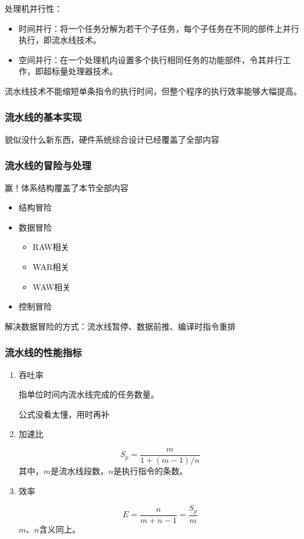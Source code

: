 \documentclass[12pt, a4paper, oneside]{ctexart}
\begin{document}
处理机并行性：
\begin{itemize}
  \item 时间并行：将一个任务分解为若干个子任务，每个子任务在不同的部件上并行执行，即流水线技术。
  \item 空间并行：在一个处理机内设置多个执行相同任务的功能部件，令其并行工作，即超标量处理器技术。
\end{itemize}

流水线技术不能缩短单条指令的执行时间，但整个程序的执行效率能够大幅提高。

\subsubsection{流水线的基本实现}

貌似没什么新东西，硬件系统综合设计已经覆盖了全部内容

\subsubsection{流水线的冒险与处理}

赢！体系结构覆盖了本节全部内容

\begin{itemize}
  \item 结构冒险
  \item 数据冒险
  \begin{itemize}
    \item RAW相关
    \item WAR相关
    \item WAW相关
  \end{itemize}
  \item 控制冒险
\end{itemize}

解决数据冒险的方式：流水线暂停、数据前推、编译时指令重排

\subsubsection{流水线的性能指标}

\begin{enumerate}
  \item 吞吐率
  
  指单位时间内流水线完成的任务数量。

  公式没看太懂，用时再补
  \item 加速比
  
  \begin{equation*}
    S_p=\frac{m}{1+(m-1)/n}
  \end{equation*}
  其中，$m$是流水线段数，$n$是执行指令的条数。
  \item 效率
  
  \begin{equation*}
    E=\frac{n}{m+n-1}=\frac{S_p}{m}
  \end{equation*}
  $m$、$n$含义同上。
\end{enumerate}
\end{document}
